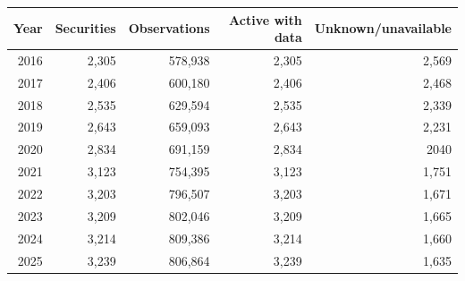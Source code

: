 \begin{tabular}{@{}rrrrr@{}}
\toprule
Year & Securities & Observations & Active with data & Unknown/unavailable \\
\midrule
2016 & 2,305 & 578,938 & 2,305 & 2,569 \\
2017 & 2,406 & 600,180 & 2,406 & 2,468 \\
2018 & 2,535 & 629,594 & 2,535 & 2,339 \\
2019 & 2,643 & 659,093 & 2,643 & 2,231 \\
2020 & 2,834 & 691,159 & 2,834 & 2040 \\
2021 & 3,123 & 754,395 & 3,123 & 1,751 \\
2022 & 3,203 & 796,507 & 3,203 & 1,671 \\
2023 & 3,209 & 802,046 & 3,209 & 1,665 \\
2024 & 3,214 & 809,386 & 3,214 & 1,660 \\
2025 & 3,239 & 806,864 & 3,239 & 1,635 \\
\bottomrule
\end{tabular}
